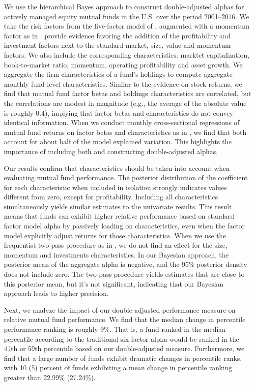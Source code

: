 We use the hierarchical Bayes approach to construct double-adjusted alphas for actively managed equity mutual funds in the U.S. over the period 2001--2016. We take the risk factors from the five-factor model of \citet{FAMA20151}, augmented with a momentum factor as in \citet{carhart1997persistence}. \citet{jordan2016skill} provide evidence favoring the addition of the profitability and investment factors next to the standard market, size, value and momentum factors. We also include the corresponding characteristics: marktet capitalization, book-to-market ratio, momentum, operating profitability and asset growth. We aggregate the firm characteristics of a fund's holdings to compute aggregate monthly fund-level characteristics. Similar to the evidence on stock returns, we find that mutual fund factor betas and holdings characteristics are correlated, but the correlations are modest in magnitude (e.g., the average of the absolute value is roughly 0.4), implying that factor betas and characteristics do not convey identical information. When we conduct monthly cross-sectional regressions of mutual fund returns on factor betas and characteristics as in \citet{avramov2006asset}, we find that both account for about half of the model explained variation. This highlights the importance of including both and constructing double-adjusted alphas.

Our results confirm that characteristics should be taken into account when evaluating mutual fund performance. The posterior distribution of the coefficient for each characteristic when included in isolation strongly indicates values different from zero, except for profitability. Including all characteristics simultaneously yields similar estimates to the univariate results. This result means that funds can exhibit higher relative performance based on standard factor model alpha by passively loading on characteristics, even when the factor model explicitly adjust returns for those characteristics. When we use the frequentist two-pass procedure as in \citet{busse2017double}, we do not find an effect for the size, momentum and investments characteristics. In our Bayesian approach, the posterior mean of the aggregate alpha is negative, and the 95\% posterior density does not include zero. The two-pass procedure yields estimates that are close to this posterior mean, but it's not significant, indicating that our Bayesian approach leads to higher precision.

Next, we analyze the impact of our double-adjusted performance measure on relative mutual fund performance. We find that the median change in percentile performance ranking is roughly 9\%. That is, a fund ranked in the median percentile according to the traditional six-factor alpha would be ranked in the 41th or 59th percentile based on our double-adjusted measure. Furthermore, we find that a large number of funds exhibit dramatic changes in percentile ranks, with 10 (5) percent of funds exhibiting a mean change in percentile ranking greater than 22.99\% (27.24\%). 

